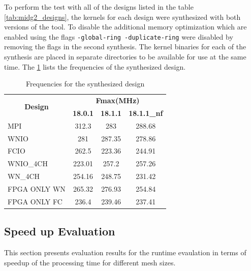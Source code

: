To perform the test with all of the designs listed in the table \ref{tab:midg2_designs},
the kernels for each design were synthesized with both versions of the tool. To disable
the additional memory optimization which are enabled using the flags \texttt{-global-ring -duplicate-ring}
were disabled by removing the flags in the second synthesis. The kernel binaries for each
of the synthesis are placed in separate directories to be available for use at the same time.
The \ref{tab:syn_freq} lists the frequencies of the synthesized design.

\begin{table}[ht]
    \centering
    \caption{Frequencies for the synthesized design }
    \label{tab:syn_freq}
    \begin{tabular}{lccc}
    \multicolumn{1}{c}{\multirow{2}{*}{\textbf{Design}}} & \multicolumn{3}{c}{\textbf{Fmax(MHz)}} \\
    \cline{2-4}
    \multicolumn{1}{c}{} & \textbf{18.0.1} & \textbf{18.1.1} & \textbf{18.1.1\_nf} \\
    \hline
    MPI & 312.3 & 283 & 288.68 \\
    WNIO & 281 & 287.35 & 278.86 \\
    FCIO & 262.5 & 223.36 & 244.91 \\
    WNIO\_4CH & 223.01 & 257.2 & 257.26 \\
    WN\_4CH & 254.16 & 248.75 & 231.42 \\
    FPGA ONLY WN & 265.32 & 276.93 & 254.84 \\
    FPGA ONLY FC & 236.4 & 239.46 & 237.41
    \end{tabular}%
\end{table}


\subsection{Speed up Evaluation}

This section presents evaluation results for the runtime evaulation
in terms of speedup of the processing time for different mesh sizes.

